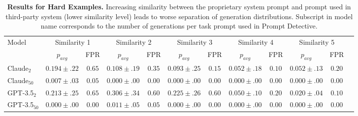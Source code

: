 \begin{table*}[t!]
  \caption{{\bf Results for Hard Examples.} Increasing similarity between the proprietary system prompt and prompt used in third-party system (lower similarity level) leads to worse separation of generation distributions. Subscript in model name corresponds to the number of generations per task prompt used in Prompt Detective.}
  \label{tab: hard-examples-results}
  \centering
  \setlength{\tabcolsep}{3pt}
  \begin{tabular}{lccccccccccc}
    \toprule
   Model & \multicolumn{2}{c}{Similarity 1} & \multicolumn{2}{c}{Similarity 2} & \multicolumn{2}{c}{Similarity 3} & \multicolumn{2}{c}{Similarity 4} & \multicolumn{2}{c}{Similarity 5} \\
    \cmidrule(lr){2-11}
    
  & $p_{avg}$ & FPR & $p_{avg}$ & FPR & $p_{avg}$ & FPR & $p_{avg}$ & FPR & $p_{avg}$ & FPR \\
    \midrule

Claude$_2$ &  $0.194 \scriptscriptstyle \pm \scriptstyle .22$ & $0.65$  & $0.108 \scriptscriptstyle \pm \scriptstyle .19$ & $0.35$ & $0.093 \scriptscriptstyle \pm \scriptstyle .25$ & $0.15$ & $0.052 \scriptscriptstyle \pm \scriptstyle .18$ & $0.10$ & $0.052 \scriptscriptstyle \pm \scriptstyle .13$ & $0.20$ \\

Claude$_{50}$ &  $0.007 \scriptscriptstyle \pm \scriptstyle .03$ & $0.05$   & $0.000 \scriptscriptstyle \pm \scriptstyle .00$ & $0.00$ & $0.000 \scriptscriptstyle \pm \scriptstyle .00$ & $0.00$ & $0.000 \scriptscriptstyle \pm \scriptstyle .00$ & $0.00$ & $0.000 \scriptscriptstyle \pm \scriptstyle .00$ & $0.00$ \\

\midrule
GPT-3.5$_2$ & $0.213 \scriptscriptstyle \pm \scriptstyle .25$ & $0.65$ & $0.306 \scriptscriptstyle \pm \scriptstyle .34$ & $0.60$ & $0.225 \scriptscriptstyle \pm \scriptstyle .26$ & $0.60$ & $0.050 \scriptscriptstyle \pm \scriptstyle .10$ & $0.20$ & $0.020 \scriptscriptstyle \pm \scriptstyle .04$ & $0.10$ \\

GPT-3.5$_{50}$ & $0.000 \scriptscriptstyle \pm \scriptstyle .00$ & $0.00$ & $0.011 \scriptscriptstyle \pm \scriptstyle .05$ & $0.05$ & $0.000 \scriptscriptstyle \pm \scriptstyle .00$ & $0.00$ & $0.000 \scriptscriptstyle \pm \scriptstyle .00$ & $0.00$ & $0.000 \scriptscriptstyle \pm \scriptstyle .00$ & $0.00$ \\


\bottomrule
\end{tabular}
\end{table*}

